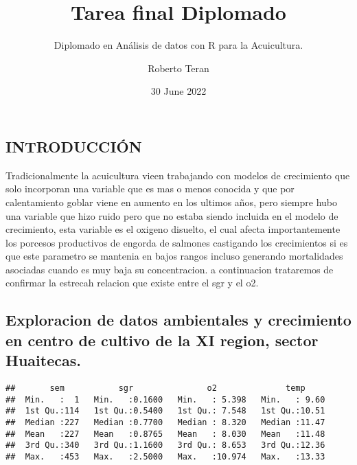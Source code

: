 \documentclass[
]{article}
\title{Tarea final Diplomado}
\subtitle{Diplomado en Análisis de datos con R para la Acuicultura.}
\author{Roberto Teran}
\date{30 June 2022}
\newenvironment{Shaded}{\begin{snugshade}}{\end{snugshade}}
\newcommand{\FunctionTok}[1]{\textcolor[rgb]{0.00,0.00,0.00}{#1}}
\newcommand{\NormalTok}[1]{#1}
\newcommand{\OtherTok}[1]{\textcolor[rgb]{0.56,0.35,0.01}{#1}}
\newcommand{\SpecialCharTok}[1]{\textcolor[rgb]{0.00,0.00,0.00}{#1}}
\begin{document}
\maketitle

\hypertarget{introducciuxf3n}{%
\subsection{INTRODUCCIÓN}\label{introducciuxf3n}}

Tradicionalmente la acuicultura vieen trabajando con modelos de
crecimiento que solo incorporan una variable que es mas o menos conocida
y que por calentamiento goblar viene en aumento en los ultimos años,
pero siempre hubo una variable que hizo ruido pero que no estaba siendo
incluida en el modelo de crecimiento, esta variable es el oxigeno
disuelto, el cual afecta importantemente los porcesos productivos de
engorda de salmones castigando los crecimientos si es que este parametro
se mantenia en bajos rangos incluso generando mortalidades asociadas
cuando es muy baja su concentracion. a continuacion trataremos de
confirmar la estrecah relacion que existe entre el sgr y el o2.

\hypertarget{exploracion-de-datos-ambientales-y-crecimiento-en-centro-de-cultivo-de-la-xi-region-sector-huaitecas.}{%
\subsection{Exploracion de datos ambientales y crecimiento en centro de
cultivo de la XI region, sector
Huaitecas.}\label{exploracion-de-datos-ambientales-y-crecimiento-en-centro-de-cultivo-de-la-xi-region-sector-huaitecas.}}

\begin{verbatim}
##       sem           sgr               o2              temp      
##  Min.   :  1   Min.   :0.1600   Min.   : 5.398   Min.   : 9.60  
##  1st Qu.:114   1st Qu.:0.5400   1st Qu.: 7.548   1st Qu.:10.51  
##  Median :227   Median :0.7700   Median : 8.320   Median :11.47  
##  Mean   :227   Mean   :0.8765   Mean   : 8.030   Mean   :11.48  
##  3rd Qu.:340   3rd Qu.:1.1600   3rd Qu.: 8.653   3rd Qu.:12.36  
##  Max.   :453   Max.   :2.5000   Max.   :10.974   Max.   :13.33
\end{verbatim}

\begin{Shaded}
\end{Shaded}
\end{document}
